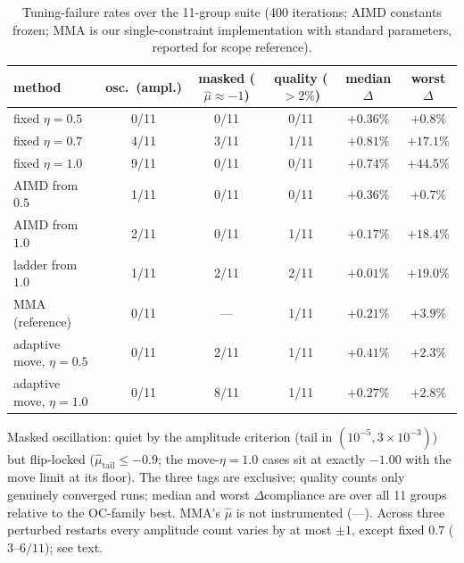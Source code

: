\documentclass[11pt,a4paper]{article}
\newcommand{\muh}{\hat{\mu}}
\begin{document}
\begin{table}[t]
\centering\small
\caption{Tuning-failure rates over the 11-group suite (400 iterations;
AIMD constants frozen; MMA is our single-constraint implementation with
standard parameters, reported for scope reference).}
\label{tab:failure}
\begin{tabular}{lccccc}
\toprule
method & osc.\ (ampl.) & masked ($\muh{\approx}{-}1$) &
quality ($>2\%$) & median $\Delta$ & worst $\Delta$ \\
\midrule
fixed $\eta=0.5$ & 0/11 & 0/11 & 0/11 & $+0.36\%$ & $+0.8\%$ \\
fixed $\eta=0.7$ & 4/11 & 3/11 & 1/11 & $+0.81\%$ & $+17.1\%$ \\
fixed $\eta=1.0$ & 9/11 & 0/11 & 0/11 & $+0.74\%$ & $+44.5\%$ \\
AIMD from $0.5$ & 1/11 & 0/11 & 0/11 & $+0.36\%$ & $\mathbf{+0.7\%}$ \\
AIMD from $1.0$ & 2/11 & 0/11 & 1/11 & $+0.17\%$ & $+18.4\%$ \\
ladder from $1.0$ & 1/11 & 2/11 & 2/11 & $+0.01\%$ & $+19.0\%$ \\
MMA (reference) & 0/11 & --- & 1/11 & $+0.21\%$ & $+3.9\%$ \\
adaptive move, $\eta=0.5$ & 0/11 & 2/11 & 1/11 & $+0.41\%$ & $+2.3\%$ \\
adaptive move, $\eta=1.0$ & 0/11 & 8/11 & 1/11 & $+0.27\%$ & $+2.8\%$ \\
\bottomrule
\end{tabular}

\smallskip
{\footnotesize Masked oscillation: quiet by the amplitude criterion
(tail in $(10^{-5},3\times10^{-3})$) but flip-locked
($\muh_{\mathrm{tail}}\le-0.9$; the move-$\eta{=}1.0$ cases sit at
exactly $-1.00$ with the move limit at its floor). The three tags are
exclusive; quality counts only genuinely converged runs; median and
worst $\Delta$compliance are over all 11 groups relative to the
OC-family best. MMA's $\muh$ is not instrumented (---). Across three
perturbed restarts every amplitude count varies by at most $\pm1$,
except fixed $0.7$ ($3$--$6/11$); see text.}
\end{table}
\end{document}
